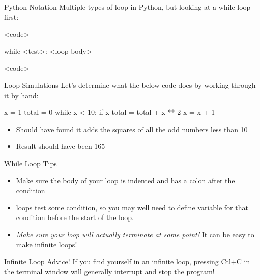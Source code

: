 \documentclass[pdf, aspectratio=169, 12pt]{beamer}
\begin{document}
\begin{frame}[fragile]{Python Notation}
	Multiple types of loop in Python, but looking at a \alert{while} loop first:
	\begin{pythoncode}
		<code>

		while <test>:
			<loop body>

		<code>
	\end{pythoncode}
\end{frame}

\begin{frame}[fragile]{Loop Simulations}
	Let's determine what the below code does by working through it by hand:
	\begin{pythoncode}
		x = 1
		total = 0
		while x < 10:
			if x %
				total = total + x ** 2
			x = x + 1
	\end{pythoncode}
	\pause
	\begin{itemize}
		\item Should have found it adds the squares of all the odd numbers less than 10
		\item Result should have been 165
	\end{itemize}
\end{frame}

\begin{frame}{While Loop Tips}
	\begin{itemize}
		\item Make sure the body of your  loop is indented and has a colon after the condition
		\item {} loops test some condition, so you may well need to define variable for that condition before the start of the loop.
		\item \emph{Make sure your loop will actually terminate at some point!} It can be easy to make infinite loops!
	\end{itemize}
	\begin{alertblock}{Infinite Loop Advice!}
		If you find yourself in an infinite loop, pressing Ctl+C in the terminal window will generally interrupt and stop the program!
	\end{alertblock}
\end{frame}


\end{document}
